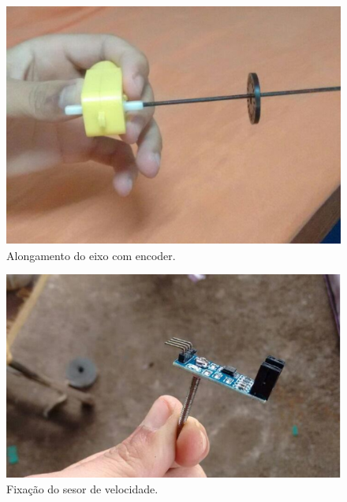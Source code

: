 \begin{itemize}
        \begin{figure}[H]                                                           
            \centering                                                                
            \includegraphics[scale=0.5]{figuras/eixoencoder.png}               
            \caption{Alongamento do eixo com encoder.}    
            \label{img:eixoencoder}                                            
         \end{figure}

         \begin{figure}[H]                                                           
            \centering                                                                
            \includegraphics[scale=0.5]{figuras/fixacaoencoder.png}               
            \caption{Fixação do sesor de velocidade.}    
            \label{img:fixacao_encoder}                                            
         \end{figure}


\end{itemize}
